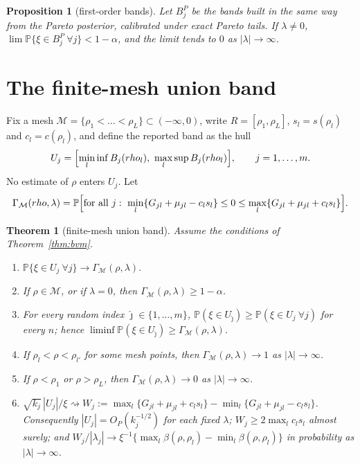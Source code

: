 \documentclass[11pt]{article}
\newtheorem{theorem}{Theorem}
\newtheorem{proposition}{Proposition}
\theoremstyle{definition}
\theoremstyle{remark}
\numberwithin{equation}{section}
\newcommand{\Prob}{\mathbb{P}}
\newcommand{\dto}{\rightsquigarrow}
\newcommand{\Mesh}{\mathcal{M}}
\begin{document}
\begin{proposition}[first-order bands]\label{prop:firstorder}
Let $B^{P}_j$ be the bands built in the same way from the Pareto posterior, calibrated under exact Pareto tails. If $\lambda\ne0$, $\lim\Prob\{\xi\in B^P_j\ \forall j\}<1-\alpha$, and the limit tends to $0$ as $|\lambda|\to\infty$.
\end{proposition}

\section{The finite-mesh union band}\label{sec:union}

Fix a mesh $\Mesh=\{\rho_1<\dots<\rho_L\}\subset(-\infty,0)$, write $R=[\rho_1,\rho_L]$, $s_l=s(\rho_l)$ and $c_l=c(\rho_l)$, and define the reported band as the hull
\begin{equation}\label{eq:U}
U_j=\Bigl[\min_{l}\inf B_j(\rho_l),\ \max_{l}\sup B_j(\rho_l)\Bigr],\qquad j=1,\dots,m.
\end{equation}
No estimate of $\rho$ enters $U_j$. Let
\[
\Gamma_\Mesh(\rho,\lambda)=\Prob\Bigl[\text{for all }j:\ \min_l\{G_{jl}+\mu_{jl}-c_ls_l\}\le0\le\max_l\{G_{jl}+\mu_{jl}+c_ls_l\}\Bigr].
\]

\begin{theorem}[finite-mesh union band]\label{thm:union}
Assume the conditions of Theorem~\ref{thm:bvm}.
\begin{enumerate}
\item[(a)] $\Prob\{\xi\in U_j\ \forall j\}\to\Gamma_\Mesh(\rho,\lambda)$.
\item[(b)] If $\rho\in\Mesh$, or if $\lambda=0$, then $\Gamma_\Mesh(\rho,\lambda)\ge1-\alpha$.
\item[(c)] For every random index $\hat\jmath\in\{1,\dots,m\}$, $\Prob(\xi\in U_{\hat\jmath})\ge\Prob(\xi\in U_j\ \forall j)$ for every $n$; hence $\liminf\Prob(\xi\in U_{\hat\jmath})\ge\Gamma_\Mesh(\rho,\lambda)$.
\item[(d)] If $\rho_l<\rho<\rho_{l'}$ for some mesh points, then $\Gamma_\Mesh(\rho,\lambda)\to1$ as $|\lambda|\to\infty$.
\item[(e)] If $\rho<\rho_1$ or $\rho>\rho_L$, then $\Gamma_\Mesh(\rho,\lambda)\to0$ as $|\lambda|\to\infty$.
\item[(f)] $\sqrt{k_j}\,|U_j|/\xi\dto W_j:=\max_l\{G_{jl}+\mu_{jl}+c_ls_l\}-\min_l\{G_{jl}+\mu_{jl}-c_ls_l\}$. Consequently $|U_j|=O_P(k_j^{-1/2})$ for each fixed $\lambda$; $W_j\ge2\max_lc_ls_l$ almost surely; and $W_j/|\lambda_j|\to\xi^{-1}\{\max_l\beta(\rho,\rho_l)-\min_l\beta(\rho,\rho_l)\}$ in probability as $|\lambda|\to\infty$.
\end{enumerate}
\end{theorem}
\end{document}
